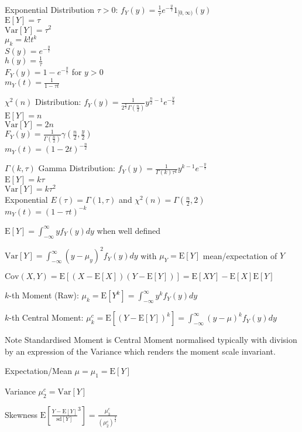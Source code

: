 Exponential Distribution $\tau>0$: $f_Y(y)=\frac{1}{\tau}e^{-\frac{y}{\tau}}1_{[0,\infty)}(y)$ \\
$\text{E}[Y]=\tau$ \\
$\text{Var}[Y]=\tau^2$ \\
$\mu_k=k! t^k$ \\
$S(y)=e^{-\frac{y}{\tau}}$ \\
$h(y)=\frac{1}{\tau}$ \\
$F_Y(y)=1-e^{-\frac{y}{\tau}}$ for $y>0$ \\
$m_Y(t)=\frac{1}{1-\tau t}$

$\chi^2 (n)$ Distribution: $f_Y(y)=\frac{1}{2^{\frac{n}{2}} \Gamma (\frac{n}{2})} y^{\frac{n}{2}-1} e^{-\frac{y}{2}}$ \\
$\text{E}[Y]=n$ \\
$\text{Var}[Y]=2n$ \\
$F_Y(y)=\frac{1}{\Gamma (\frac{n}{2})} \gamma (\frac{n}{2},\frac{y}{2})$ \\
$m_Y(t)=(1-2t)^{-\frac{n}{2}}$

$\Gamma (k,\tau)$ Gamma Distribution: $f_Y(y)=\frac{1}{\Gamma (k) \tau^k} y^{k-1} e^{-\frac{y}{\tau}}$ \\
$\text{E}[Y]=k\tau$ \\
$\text{Var}[Y]=k\tau^2$ \\
Exponential $E(\tau)=\Gamma (1,\tau)$ and $\chi^2 (n)=\Gamma (\frac{n}{2},2)$ \\
$m_Y(t)=(1-\tau t)^{-k}$

$\text{E}[Y]=\int_{-\infty}^{\infty} yf_Y(y)dy$ when well defined

$\text{Var}[Y]=\int_{-\infty}^{\infty} (y-\mu_y)^2f_Y(y)dy$ with $\mu_Y=\text{E}[Y]$ mean/expectation of $Y$

$\text{Cov}(X,Y)=\text{E}[(X-\text{E}[X])(Y-\text{E}[Y])]=\text{E}[XY]-\text{E}[X]\text{E}[Y]$

$k$-th Moment (Raw): $\mu_k=\text{E}[Y^k]=\int_{-\infty}^{\infty}y^kf_Y(y)dy$

$k$-th Central Moment: $\mu_k^c=\text{E}[(Y-\text{E}[Y])^k]=\int_{-\infty}^{\infty}(y-\mu)^kf_Y(y)dy$

Note Standardised Moment is Central Moment normalised typically with division by an expression of the Variance which renders the moment scale invariant.

Expectation/Mean $\mu=\mu_1=\text{E}[Y]$

Variance $\mu_2^c=\text{Var}[Y]$

Skewness $\text{E}\left[ \frac{Y-\text{E}[Y]}{\text{sd}[Y]}^3 \right]=\frac{\mu_3^c}{(\mu_2^c)^{\frac{3}{2}}}$

